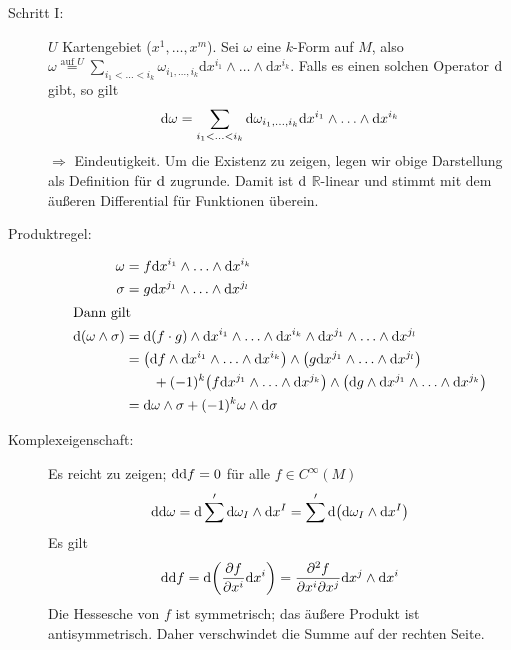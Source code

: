 \begin{description}
	\item[Schritt I:] $U$ Kartengebiet ($x^1, \ldots , x^m$). Sei $\omega$ eine $k$-Form auf $M$, also $\omega \stackrel{\text{auf $U$}}{=} \sum_{i_1 < \ldots < i_k} 
	\omega_{i_1, \ldots , i_k} \mathrm{d}x^{i_1} \wedge \ldots \wedge \mathrm{d}x^{i_k}$. Falls es einen solchen Operator $\mathrm{d}$ gibt, so gilt
	\[
		\mathrm{d} \omega = \sum_{i_1 < \ldots <i_k} \mathrm{d} \omega_{i_1, \ldots , i_k} \mathrm{d} x^{i_1} \wedge \ldots \wedge \mathrm{d} x^{i_k}
	\]
	$\Rightarrow$ Eindeutigkeit. Um die Existenz zu zeigen, legen wir obige Darstellung als Definition für $\mathrm{d}$ zugrunde. Damit ist $\mathrm{d}$ $\mathds{R}$-linear und 	
	stimmt mit dem äußeren Differential für Funktionen überein.
	\item[Produktregel:] \oE 
	\begin{align*}
		\omega &= f \mathd x^{i_1} \wedge \ldots \wedge \mathd x^{i_k} \\
		\sigma &= g \mathd x^{j_1} \wedge \ldots \wedge \mathd x^{j_l} \\
		\intertext{Dann gilt}
		\mathd(\omega \wedge \sigma) &= \mathd (f \cdot g) \wedge \mathd x^{i_1} \wedge \ldots \wedge \mathd x^{i_k} \wedge \mathd x^{j_1} \wedge \ldots 
		\wedge \mathd x^{j_l} \\
		&= \enbrace*{\mathd f \wedge \mathd x^{i_1} \wedge \ldots \wedge \mathd x^{i_k}} \wedge \enbrace*{g \mathd x^{j_1} \wedge \ldots \wedge \mathd x^{j_l}} \\
		&\qquad + (-1)^k \enbrace*{f \mathd x^{j_1} \wedge\ldots\wedge\mathd x^{j_k}} \wedge\enbrace*{\mathd g \wedge \mathd x^{j_1} \wedge \ldots \wedge \mathd x^{j_k}} \\
		&= \mathd \omega \wedge \sigma + (-1)^k \omega \wedge \mathd \sigma
	\end{align*}
	\item[Komplexeigenschaft:] Es reicht zu zeigen; $\mathrm{d} \mathrm{d} f = 0$ für alle $f \in C^\infty(M)$
	\begin{align*}
		\mathd \mathd \omega = \mathd \sum' \mathd \omega_I \wedge \mathd x^I = \sum' \mathd \enbrace*{\mathd \omega_I \wedge \mathd x^I} 
	\end{align*}
	Es gilt
	\begin{align*}
		\mathd \mathd f = \mathd \enbrace*{\diff{f}{x^i} \mathd x^i} = \frac{\partial^2 f}{\partial x^i \partial x^j} \mathd x^j \wedge \mathd x^i 
	\end{align*}
	Die Hessesche von $f$ ist symmetrisch; das äußere Produkt ist antisymmetrisch. Daher verschwindet die Summe auf der rechten Seite.

\end{description}
